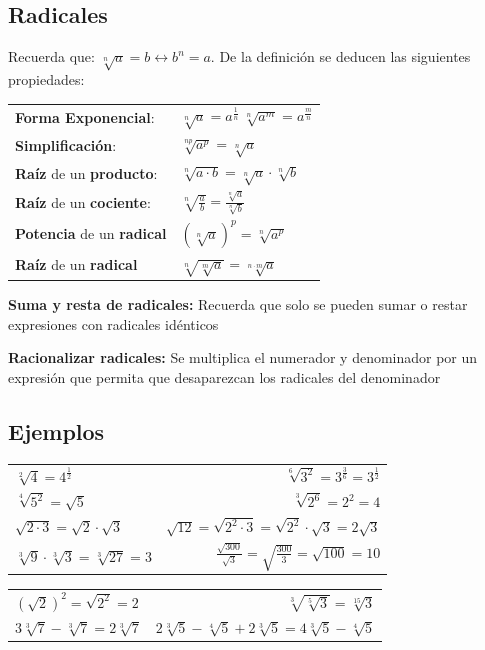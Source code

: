 \documentclass[a4paper,spanish,9pt]{extarticle}
\begin{document}
\begin{multicols*}{2}
\section{Radicales}
Recuerda que: $\sqrt[n]{a}=b \longleftrightarrow b^n=a$. De la definición se deducen las siguientes propiedades:
\vspace{0.3cm}

\begin{tabular}{ll}
\textbf{Forma Exponencial}: & $\sqrt[n]{a}=a^\frac{1}{n} \ \sqrt[n]{a^m}=a^\frac{m}{n} $ \\
\textbf{Simplificación}: & $\sqrt[np]{a^p}=\sqrt[n]{a}$ \\
\textbf{Raíz} de un \textbf{producto}: & $\sqrt[n]{a\cdot b}=\sqrt[n]{a}\cdot\sqrt[n]{b}$ \\
\textbf{Raíz} de un \textbf{cociente}: & $\sqrt[n]{\frac{a}{b}}=\frac{\sqrt[n]{a}}{\sqrt[n]{b}}$ \\
\textbf{Potencia} de un \textbf{radical} & $\left(\sqrt[n]{a}\right)^p=\sqrt[n]{a^p}$ \\
\textbf{Raíz} de un \textbf{radical} & $\sqrt[n]{\sqrt[m]{a}}=\sqrt[n\cdot m]{a}$ \\
\end{tabular}

\vspace{0.5cm}
\textbf{Suma y resta de radicales:} Recuerda que solo se pueden sumar o restar expresiones con radicales idénticos

\vspace{0.5cm}
\textbf{Racionalizar radicales:} Se multiplica el numerador y denominador por un expresión que permita que desaparezcan los radicales del denominador

\subsection{Ejemplos}
\begin{tabular}{lr}
$\sqrt[2]{4}=4^\frac{1}{2}$ & $\sqrt[6]{3^2}=3^\frac{3}{6}=3^\frac{1}{2}$ \\
$\sqrt[4]{5^2}=\sqrt{5}$ & $\sqrt[3]{2^6}=2^2=4$\\
$\sqrt{2\cdot 3}=\sqrt{2}\cdot\sqrt{3}$ & $\sqrt{12}=\sqrt{2^2\cdot 3}=\sqrt{2^2}\cdot\sqrt{3}=2\sqrt{3}$\\ 
$\sqrt[3]{9}\cdot\sqrt[3]{3}=\sqrt[3]{27}=3$ & $\frac{\sqrt{300}}{\sqrt{3}}=\sqrt{\frac{300}{3}}=\sqrt{100}=10$
\end{tabular}

\begin{tabular}{lr}
$\left(\sqrt{2}\right)^2=\sqrt{2^2}=2$ & $\sqrt[3]{\sqrt[5]{3}}=\sqrt[15]{3}$\\
$3\sqrt[3]{7}-\sqrt[3]{7}=2\sqrt[3]{7}$ & $2\sqrt[3]{5}-\sqrt[4]{5}+2\sqrt[3]{5}=4\sqrt[3]{5}-\sqrt[4]{5}$
\end{tabular}


\end{multicols*}
\end{document}

